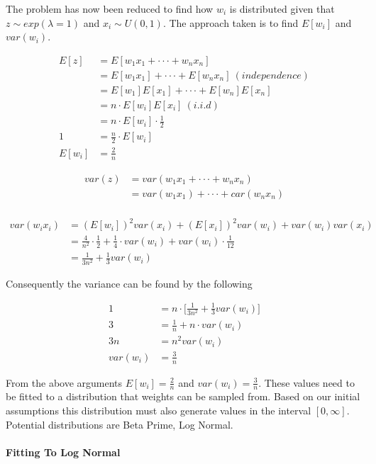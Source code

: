 The problem has now been reduced to find how $w_i$ is distributed given that $z \sim exp(\lambda = 1)$ and $x_i \sim U(0,1)$. The approach taken is to find $E[w_i]$ and $var(w_i)$.

\begin{align*}
	E[z] &= E[w_1x_1 + \cdot \cdot \cdot + w_nx_n]\\
	&= E[w_1x_1] + \cdot \cdot \cdot + E[w_nx_n]\ (independence)\\
	&= E[w_1]E[x_1] + \cdot \cdot \cdot + E[w_n]E[x_n]\\
	&= n \cdot E[w_i]E[x_i]\ (i.i.d)\\
	&= n \cdot E[w_i] \cdot \frac{1}{2}\\
	1 &= \frac{n}{2} \cdot E[w_i]\\
	E[w_i] &= \frac{2}{n}
\end{align*}

\begin{align*}
	var(z) &= var(w_1x_1 + \cdot \cdot \cdot + w_nx_n)\\
	&= var(w_1x_1) + \cdot \cdot \cdot + car(w_nx_n)\\
\end{align*}

\begin{align*}
	var(w_ix_i) &= (E[w_i])^2var(x_i) + (E[x_i])^2var(w_i) + var(w_i)var(x_i)\\
	&= \frac{4}{n^2} \cdot \frac{1}{2} + \frac{1}{4} \cdot var(w_i) + var(w_i) \cdot \frac{1}{12}\\
	&= \frac{1}{3 n^2} + \frac{1}{3}var(w_i)
\end{align*}

Consequently the variance can be found by the following

\begin{align*}
	1 &= n \cdot \big[\frac{1}{3 n^2} + \frac{1}{3}var(w_i)\big]\\
	3 &= \frac{1}{n} + n \cdot var(w_i)\\
	3n &= n^2 var(w_i)\\
	var(w_i) &= \frac{3}{n}
\end{align*}

From the above arguments $E[w_i] = \frac{2}{n}$ and $var(w_i) = \frac{3}{n}$. These values need to be fitted to a distribution that weights can be sampled from. Based on our initial assumptions this distribution must also generate values in the interval $[0, \infty]$. Potential distributions are  Beta Prime, Log Normal.

\paragraph{Fitting To Log Normal}

